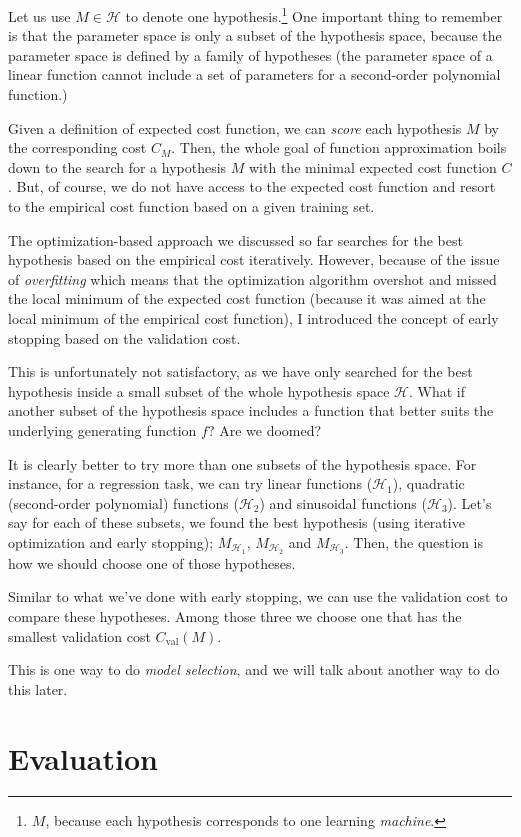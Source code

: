 \documentclass{report}
\newcommand{\HH}[0]{\mathcal{H}}
\newcommand{\val}{\text{val}}
\begin{document}
Let us use
$M \in \HH$ to denote one hypothesis.\footnote{
    $M$, because each hypothesis corresponds to one learning {\em machine}.
} One important thing to remember is that the parameter space is only a subset
of the hypothesis space, because the parameter space is defined by a family of
hypotheses (the parameter space of a linear function cannot include a set of
parameters for a second-order polynomial function.)

Given a definition of expected cost function, we can {\em score} each hypothesis
$M$ by the corresponding cost $C_M$. Then, the whole goal of function
approximation boils down to the search for a hypothesis $M$ with the minimal
expected cost function $C$. But, of course, we do not have access to the
expected cost function and resort to the empirical cost function based on a
given training set. 

The optimization-based approach we discussed so far searches for the best
hypothesis based on the empirical cost iteratively. However, because of the
issue of {\em overfitting} which means that the optimization algorithm overshot
and missed the local minimum of the expected cost function (because it was aimed
at the local minimum of the empirical cost function), I introduced the concept
of early stopping based on the validation cost.

This is unfortunately not satisfactory, as we have only searched for the best
hypothesis inside a small subset of the whole hypothesis space $\HH$. What if
another subset of the hypothesis space includes a function that better suits the
underlying generating function $f$? Are we doomed?

It is clearly better to try more than one subsets of the hypothesis space. For
instance, for a regression task, we can try linear functions ($\HH_1$),
quadratic (second-order polynomial) functions ($\HH_2$) and sinusoidal functions
($\HH_3$). Let's say for each of these subsets, we found the best hypothesis
(using iterative optimization and early stopping); $M_{\HH_1}$, $M_{\HH_2}$ and
$M_{\HH_3}$. Then, the question is how we should choose one of those hypotheses.

Similar to what we've done with early stopping, we can use the validation cost
to compare these hypotheses. Among those three we choose one that has the
smallest validation cost $C_{\val}(M)$.

This is one way to do {\em model selection}, and we will talk about another way
to do this later.

\section{Evaluation}
\end{document}
